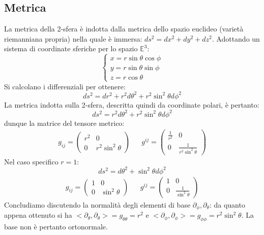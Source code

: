\subsection{Metrica}
La metrica della 2-sfera è indotta dalla metrica dello spazio euclideo (varietà riemanniana propria) nella quale è immersa: $ds^2=dx^2 + dy^2 + dz^2$. Adottando un sistema di coordinate sferiche per lo spazio $\mathbb{E}^3$:
\begin{equation*}
    \left\{\begin{array}{l}
      x = r\sin\theta \cos\phi \\
      y = r\sin\theta \sin \phi\\
      z = r\cos\theta
    \end{array}\right.
\end{equation*}
Si calcolano i differenziali per ottenere:
\begin{equation*}
    ds^2 = dr^2 + r^2d\theta^2 + r^2\sin^2\theta d\phi^2
\end{equation*}
La metrica indotta sulla 2-sfera, descritta quindi da coordinate polari, è pertanto:
\begin{equation}
    ds^2 =  r^2d\theta^2 + r^2\sin^2\theta d\phi^2
    \label{eq.metrica2-sfera}
\end{equation}
dunque la matrice del tensore metrico:
\begin{align*}
   g_{ij}= \begin{pmatrix}
     r^2 & 0 \\
     0 & r^2\sin^2\theta
    \end{pmatrix}
    & &
    g^{ij} = \begin{pmatrix}
    \frac{1}{r^2} & 0 \\
     0 & \frac{1}{r^2\sin^2\theta}
    \end{pmatrix}
\end{align*}
Nel caso specifico $r=1$:
\begin{equation*}
        ds^2 =  d\theta^2 + \sin^2\theta d\phi^2
\end{equation*}
\begin{align*}
    g_{ij}= \begin{pmatrix}
     1 & 0 \\
     0 & \sin^2\theta
    \end{pmatrix}
    & &
    g^{ij} = \begin{pmatrix}
    1 & 0 \\
     0 & \frac{1}{\sin^2\theta}
    \end{pmatrix}
\end{align*}
Concludiamo discutendo la normalità degli elementi di base $\partial_\phi, \partial_\theta$: da quanto appena ottenuto si ha $<\partial_\theta, \partial_\theta > = g_{\theta\theta} = r^2$ e $<\partial_\phi,\partial_\phi > = g_{\phi\phi} = r^2\sin^2\theta$. La base non è pertanto ortonormale.

